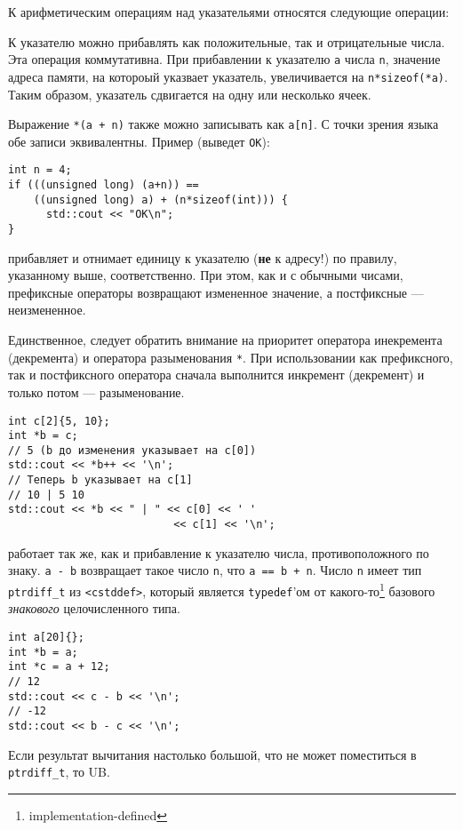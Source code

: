 К арифметическим операциям над указательями относятся следующие операции:
\begin{enumerate}
   К указателю можно прибавлять как положительные,
  так и отрицательные числа. Эта операция коммутативна. При прибавлении к указателю
  \verb|a| числа \verb|n|, значение адреса памяти, на котороый указвает указатель,
  увеличивается на \verb|n*sizeof(*a)|. Таким образом, указатель сдвигается на одну или
  несколько ячеек.

  Выражение \verb|*(a + n)| также можно записывать как \verb|a[n]|.
  С точки зрения языка обе записи эквивалентны.
  Пример (выведет \verb|OK|):
\begin{verbatim}
int n = 4;
if (((unsigned long) (a+n)) ==
    ((unsigned long) a) + (n*sizeof(int))) {
      std::cout << "OK\n";
}
\end{verbatim}

   прибавляет и отнимает единицу к указателю (\textbf{не} к адресу!) по правилу, указанному
  выше, соответственно. При этом, как и с обычными чисами, префиксные операторы возвращают измененное
  значение, а постфиксные --- неизмененное.

  Единственное, следует обратить внимание на приоритет оператора инекремента (декремента)
  и оператора разыменования \verb|*|. При использовании как префиксного, так и постфиксного
  оператора сначала выполнится инкремент (декремент) и только потом --- разыменование.
\begin{verbatim}
int c[2]{5, 10};
int *b = c;
// 5 (b до изменения указывает на c[0])
std::cout << *b++ << '\n';
// Теперь b указывает на c[1]
// 10 | 5 10
std::cout << *b << " | " << c[0] << ' '
                          << c[1] << '\n';
\end{verbatim}

   работает так же, как и прибавление к указателю
  числа, противоположного по знаку.
   \verb|a - b| возвращает такое число \verb|n|,
  что \verb|a == b + n|. Число \verb|n| имеет тип \verb|ptrdiff_t| из \verb|<cstddef>|,
  который является \verb|typedef|'ом от какого-то\footnote{implementation-defined} базового
  \textit{знакового} целочисленного типа.
\begin{verbatim}
int a[20]{};
int *b = a;
int *c = a + 12;
// 12
std::cout << c - b << '\n';
// -12
std::cout << b - c << '\n';
\end{verbatim}
  Если результат вычитания настолько большой, что не может поместиться в \verb|ptrdiff_t|,
  то UB.
\end{enumerate}

